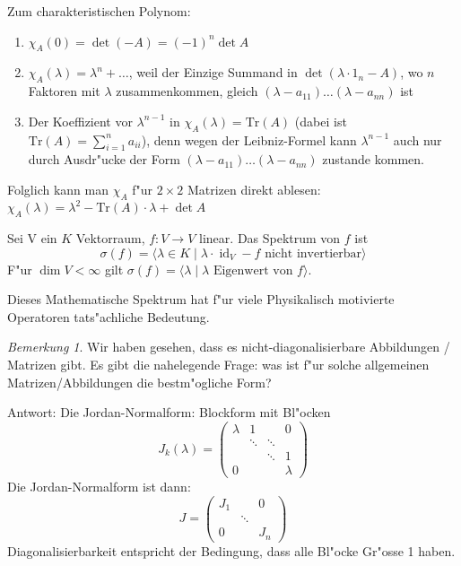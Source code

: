 \documentclass[oneside,fontsize=11pt,paper=a4,BCOR=0mm,DIV=12,automark,headsepline]{scrbook}
\newcommand{\gq}[1]{\glqq{}#1\grqq{}} %
\DeclareMathOperator{\mId}{id}
\theoremstyle{remark}
\theoremstyle{definition}
\theoremstyle{definition}
\theoremstyle{remark}
\newtheorem*{bem}{Bemerkung}
\begin{document}
Zum charakteristischen Polynom:
\begin{relation}
  \begin{enumerate}
  \item $\chi_A(0) = \det (-A) = (-1)^n \det A$
  \item $\chi_A (\lambda) = \lambda^n + \dots$, weil der Einzige Summand in \(\det (\lambda\cdot 1_n-A)\), wo \(n\) Faktoren mit \(\lambda\) zusammenkommen, gleich \((\lambda- a_{11})\dots (\lambda - a_{nn})\) ist
  \item Der Koeffizient vor \(\lambda^{n-1}\) in \(\chi_A(\lambda)=\text{Tr}(A)\) (dabei ist \(\text{Tr}(A) = \sum_{i=1}^n a_{ii}\)), denn wegen der Leibniz-Formel kann \(\lambda^{n-1}\) auch nur durch Ausdr"ucke der Form \((\lambda - a_{11})\dots (\lambda - a_{nn})\) zustande kommen.
  \end{enumerate}
\end{relation}

Folglich kann man $\chi_A$ f"ur $2\times 2$ Matrizen direkt ablesen: \(\chi_A(\lambda) = \lambda^2 - \text{Tr}(A)\cdot \lambda + \det A\)

\begin{definition}{}{}
  Sei V ein $K$ Vektorraum, \(f: V\to V\) linear. Das Spektrum von \(f\) ist \[\sigma(f) = \langle \lambda\in K \mid \lambda\cdot\mId_V -f \text{ nicht invertierbar}\rangle\]
  F"ur \(\dim V < \infty\) gilt \(\sigma(f) = \langle \lambda \mid \lambda \text{ Eigenwert von }f\rangle\).
\end{definition}
Dieses Mathematische Spektrum hat f"ur viele Physikalisch motivierte Operatoren
tats"achliche Bedeutung.

\begin{bem}
  Wir haben gesehen, dass es nicht-diagonalisierbare Abbildungen / Matrizen gibt. Es gibt die
  nahelegende Frage: was ist f"ur solche allgemeinen Matrizen/Abbildungen die
  \gq{bestm"ogliche} Form?
\end{bem}
\begin{relation}
  Antwort: Die Jordan-Normalform: Blockform mit Bl"ocken \[J_k(\lambda) =
    \begin{pmatrix}
      \lambda & 1 &  & 0 \\
       & \ddots & \ddots &  \\
       &  & \ddots & 1 \\
      0 &  &  & \lambda
    \end{pmatrix}
\]
Die Jordan-Normalform ist dann:
\[ J= 
  \begin{pmatrix}
    J_1 & & 0 \\
    & \ddots & \\
    0 & & J_n
  \end{pmatrix}
\]
  Diagonalisierbarkeit entspricht der Bedingung, dass  alle Bl"ocke Gr"osse 1 haben.
\end{relation}
\end{document}
